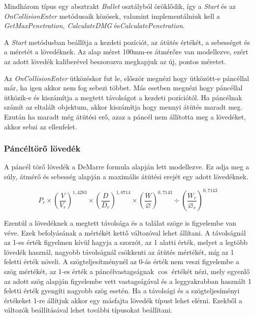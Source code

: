 \documentclass[
]{thesis-ekf}
\theoremstyle{definition}
\theoremstyle{remark}
\begin{document}
Mindhárom típus egy absztrakt \emph{Bullet} osztályból öröklődik, így a \emph{Start} és az \emph{OnCollisionEnter} metódusaik közösek, valamint implementálniuk kell a \emph{GetMaxPenetration, CalculateDMG} és\emph{CalculatePenetration}.



A \emph{Start} metódusban beállítja a kezdeti pozíciót, az átütés értékét, a sebességet és a méretét a lövedéknek. Az alap méret 100mm-es átmérőre van modellezve, ezért az adott lövedék kaliberével beszorozva megkapjuk az új, pontos méretet.

Az \emph{OnCollisionEnter} ütközéskor fut le, először megnézi hogy ütközött-e páncéllal már, ha igen akkor nem fog sebezi többet. Más esetben megnézi hogy páncéllal ütközik-e és kiszámítja a megtett távolságot a kezdeti pozíciótól. Ha páncélnak számít az eltalált objektum, akkor kiszámítja hogy mennyi átütés maradt meg. Ezután ha maradt még átütési erő, azaz a páncél nem állította meg a lövedéket, akkor sebzi az ellenfelet.


\subsubsection{Páncéltörő lövedék}

A páncél törő lövedék a DeMarre formula alapján lett modellezve. Ez adja meg a súly, átmérő és sebesség alapján a maximális átütési erejét egy adott lövedéknek.

\begin{equation}
 P_r \times \left( \frac{V}{V_r}\right)^{1,4283} \times \left( \frac{D}{D_r} \right)^{1,0714}  \times \left(\frac{W}{\varnothing}\right)^{0,7143} \div \left(\frac{W_r}{\varnothing_r}\right)^{0,7143}
 \label{demarre}
\end{equation}


Ezentúl a lövedéknek a megtett távolsága és a találat szöge is figyelembe van véve. Ezek befolyásának a mértékét kettő változóval lehet állítani. A távolságnál az 1-es érték figyelmen kívül hagyja a szorzót, az 1 alatti érték, melyet a legtöbb lövedék használ, nagyobb távolságnál csökkenti az átütés mértékét, míg az 1 feletti érték növeli. A szögteljesítménynél az 0-ás érték nem veszi figyelembe a szög mértékét, az 1-es érték a páncélvastagságnak $\cos$ értékét nézi, mely egyenlő az adott szög alapján figyelembe vett vastagságával és a leggyakrabban használt 1 feletti érték gyengíti nagyobb szög esetén. Ha a távolsági és a szögteljesíményi értékeket 1-re állítjuk akkor egy másfajta lövedék típust lehet elérni. Ezekből a változók beállításával lehet további típusokat beállítani.
\end{document}

